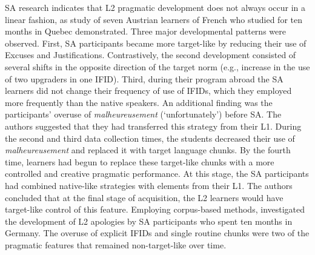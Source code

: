\documentclass[output=paper]{langscibook}
\begin{document}
  SA research indicates that L2 pragmatic development does not always occur in a linear fashion, as  study of seven Austrian learners of French who studied for ten months in Quebec demonstrated. Three major developmental patterns were observed. First, SA participants became more target-like by reducing their use of Excuses and Justifications. Contrastively, the second development consisted of several shifts in the opposite direction of the target norm (e.g., increase in the use of two upgraders in one IFID). Third, during their program abroad the SA learners did not change their frequency of use of IFIDs, which they employed more frequently than the native speakers. An additional finding was the participants’ overuse of \textit{malheureusement} (‘unfortunately’) before SA. The authors suggested that they had transferred this strategy from their L1. During the second and third data collection times, the students decreased their use of \textit{malheureusement} and replaced it with target language chunks. By the fourth time, learners had begun to replace these target-like chunks with a more controlled and creative pragmatic performance. At this stage, the SA participants had combined native-like strategies with elements from their L1. The authors concluded that at the final stage of acquisition, the L2 learners would have target-like control of this feature. Employing corpus-based methods, \citet{Barron2019} investigated the development of L2 apologies by SA participants who spent ten months in Germany. The overuse of explicit IFIDs and single routine chunks were two of the pragmatic features that remained non-target-like over time.
\end{document}

